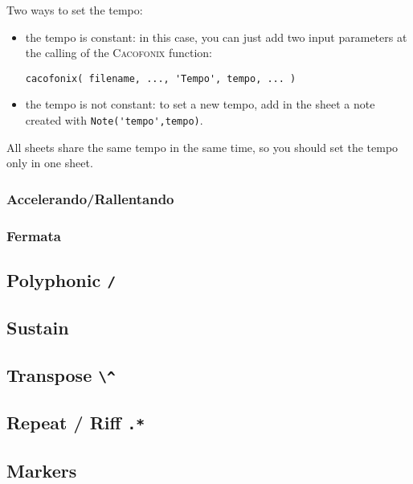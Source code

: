 \documentclass{article}
\newcommand\cacofonix{\textsc{Cacofonix}\xspace}
\begin{document}
Two ways to set the tempo:
\begin{itemize}
	\item the tempo is constant: in this case, you can just add two input parameters at the calling of the \cacofonix function:
\begin{lstlisting}
cacofonix( filename, ..., 'Tempo', tempo, ... )
\end{lstlisting}
	\item the tempo is not constant: to set a new tempo, add in the sheet a note created with \lstinline!Note('tempo',tempo)!.
\end{itemize}

All sheets share the same tempo in the same time, so you should set the tempo only in one sheet. 

\subsubsection{Accelerando/Rallentando}
\label{sec:AccelerandoRallentando}

\subsubsection{Fermata}
\label{sec:Fermata}

\subsection{Polyphonic \lstinline!/!}
\label{sec:Polyphonic}

\subsection{Sustain}
\label{sec:Sustain}

\subsection{Transpose \lstinline!\^!}
\label{sec:Transpose}

\subsection{Repeat / Riff \lstinline!.*!}
\label{sec:RepeatRiff}

\subsection{Markers}
\label{sec:Markers}
\end{document}
